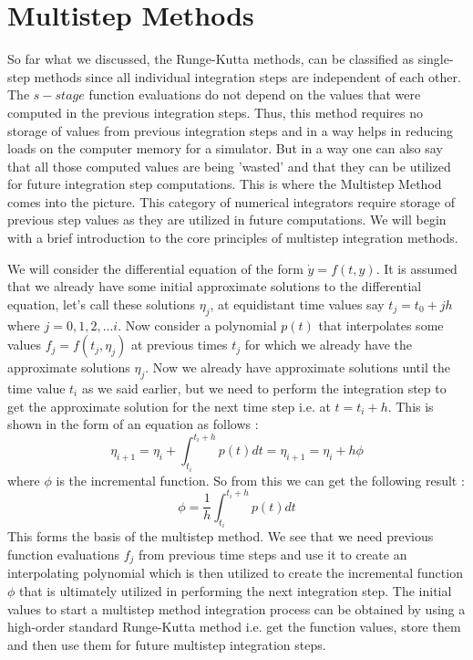 \section{Multistep Methods}
So far what we discussed, the Runge-Kutta methods, can be classified as single-step methods since all individual integration steps are independent of each other. The $s-stage$ function evaluations do not depend on the values that were computed in the previous integration steps. Thus, this method requires no storage of values from previous integration steps and in a way helps in reducing loads on the computer memory for a simulator. But in a way one can also say that all those computed values are being 'wasted' and that they can be utilized for future integration step computations. This is where the Multistep Method comes into the picture. This category of numerical integrators require storage of previous step values as they are utilized in future computations. We will begin with a brief introduction to the core principles of multistep integration methods.

We will consider the differential equation of the form $\dot{y} = f(t,y)$. It is assumed that we already have some initial approximate solutions to the differential equation, let's call these solutions $\eta_j$, at equidistant time values say $t_j = t_0 + jh$ where $j = 0,1,2,...i$. Now consider a polynomial $p(t)$ that interpolates some values $f_j = f(t_j, \eta_j)$ at previous times $t_j$ for which we already have the approximate solutions $\eta_j$. Now we already have approximate solutions until the time value $t_i$ as we said earlier, but we need to perform the integration step to get the approximate solution for the next time step i.e. at $t = t_i + h$. This is shown in the form of an equation as follows \cite{gillbook}:
\begin{equation}
\eta_{i+1} = \eta_i + \int_{t_i}^{t_i + h} p(t) dt = \eta_{i+1} = \eta_i + h \phi
\end{equation}
%
where $\phi$ is the incremental function. So from this we can get the following result \cite{gillbook}:
\begin{equation}
\phi = \frac{1}{h} \int_{t_i}^{t_i + h} p(t) dt
\end{equation}
%
This forms the basis of the multistep method. We see that we need previous function evaluations $f_j$ from previous time steps and use it to create an interpolating polynomial which is then utilized to create the incremental function $\phi$ that is ultimately utilized in performing the next integration step. The initial values to start a multistep method integration process can be obtained by using a high-order standard Runge-Kutta method i.e. get the function values, store them and then use them for future multistep integration steps.

